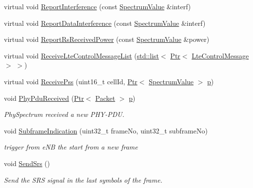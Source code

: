 \begin{DoxyCompactItemize}
\item 
virtual void \hyperlink{classns3_1_1LteUePhy_aac25482ac025b043e7d0516927984720}{Report\+Interference} (const \hyperlink{classns3_1_1SpectrumValue}{Spectrum\+Value} \&interf)
\item 
virtual void \hyperlink{classns3_1_1LteUePhy_a20cf3a136a19472fdab4ac7bd78f2c22}{Report\+Data\+Interference} (const \hyperlink{classns3_1_1SpectrumValue}{Spectrum\+Value} \&interf)
\item 
virtual void \hyperlink{classns3_1_1LteUePhy_aca025f112e83d159f7a1b0fb822d77b6}{Report\+Rs\+Received\+Power} (const \hyperlink{classns3_1_1SpectrumValue}{Spectrum\+Value} \&power)
\item 
virtual void \hyperlink{classns3_1_1LteUePhy_aa7bd315ac9c8f49652624c8d1f1b03ef}{Receive\+Lte\+Control\+Message\+List} (\hyperlink{openflow-interface_8h_afd9bcfa176617760671b67580f536fa7}{std\+::list}$<$ \hyperlink{classns3_1_1Ptr}{Ptr}$<$ \hyperlink{classns3_1_1LteControlMessage}{Lte\+Control\+Message} $>$ $>$)
\item 
virtual void \hyperlink{classns3_1_1LteUePhy_a2727abdb8f0559d6bc67349d9089723d}{Receive\+Pss} (uint16\+\_\+t cell\+Id, \hyperlink{classns3_1_1Ptr}{Ptr}$<$ \hyperlink{classns3_1_1SpectrumValue}{Spectrum\+Value} $>$ \hyperlink{lte__link__budget__x2__handover__measures_8m_ac9de518908a968428863f829398a4e62}{p})
\item 
void \hyperlink{classns3_1_1LteUePhy_ac78ec37217590a6cec1e0ca89f7014f9}{Phy\+Pdu\+Received} (\hyperlink{classns3_1_1Ptr}{Ptr}$<$ \hyperlink{classns3_1_1Packet}{Packet} $>$ \hyperlink{lte__link__budget__x2__handover__measures_8m_ac9de518908a968428863f829398a4e62}{p})
\begin{DoxyCompactList}\small\item\em Phy\+Spectrum received a new P\+H\+Y-\/\+P\+DU. \end{DoxyCompactList}\item 
void \hyperlink{classns3_1_1LteUePhy_a65c18191859a190cbd880175e2ffeac3}{Subframe\+Indication} (uint32\+\_\+t frame\+No, uint32\+\_\+t subframe\+No)
\begin{DoxyCompactList}\small\item\em trigger from e\+NB the start from a new frame \end{DoxyCompactList}\item 
void \hyperlink{classns3_1_1LteUePhy_af5e670e16b13fbb9368f75bedf199067}{Send\+Srs} ()
\begin{DoxyCompactList}\small\item\em Send the S\+RS signal in the last symbols of the frame. \end{DoxyCompactList}\item 

\end{DoxyCompactItemize}
